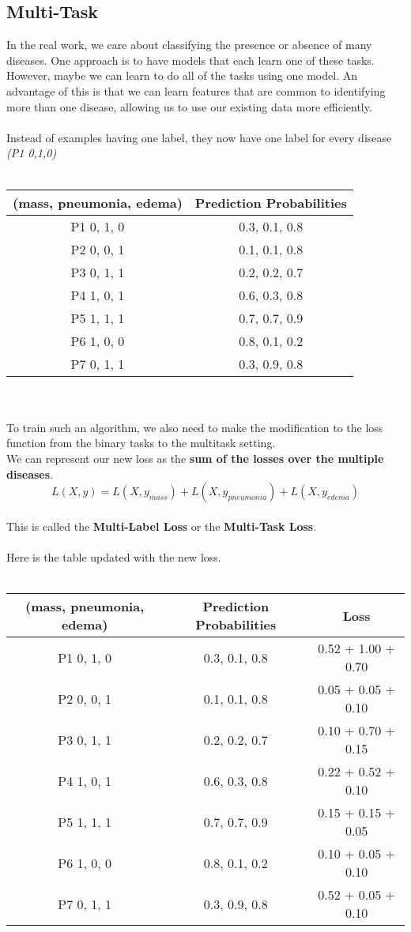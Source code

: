 \documentclass[a4paper,12pt]{article}
\begin{document}
\subsection{Multi-Task}
In the real work, we care about classifying the presence or absence of many diseases. One approach is to have models that each learn one of these tasks.\\
However, maybe we can learn to do all of the tasks using one model. An advantage of this is that we can learn features that are common to identifying more than one disease, allowing us to use our existing data more efficiently.\\
\\
Instead of examples having one label, they now have one label for every disease \textit{(P1 0,1,0)}\\
\\
\begin{tabular}{|c c|}
	\hline
	(mass, pneumonia, edema) & Prediction Probabilities \\
	\hline
	P1 0, 1, 0 & 0.3, 0.1, 0.8 \\
	P2 0, 0, 1 & 0.1, 0.1, 0.8 \\
	P3 0, 1, 1 & 0.2, 0.2, 0.7 \\
	P4 1, 0, 1 & 0.6, 0.3, 0.8 \\
	P5 1, 1, 1 & 0.7, 0.7, 0.9 \\
	P6 1, 0, 0 & 0.8, 0.1, 0.2 \\
	P7 0, 1, 1 & 0.3, 0.9, 0.8 \\
	\hline
\end{tabular}\\
\\
To train such an algorithm, we also need to make the modification to the loss function from the binary tasks to the multitask setting.\\
We can represent our new loss as the \textbf{sum of the losses over the multiple diseases}.\\
\[ L(X,y)=L(X,y_{mass}) + L(X,y_{pneumonia}) + L(X,y_{edema}) \]\\
This is called the \textbf{Multi-Label Loss} or the \textbf{Multi-Task Loss}.\\
\\
Here is the table updated with the new loss.\\
\\
\begin{tabular}{|c c c|}
	\hline
	(mass, pneumonia, edema) & Prediction Probabilities & Loss\\
	\hline
	P1 0, 1, 0 & 0.3, 0.1, 0.8 & 0.52 + 1.00 + 0.70\\
	P2 0, 0, 1 & 0.1, 0.1, 0.8 & 0.05 + 0.05 + 0.10\\
	P3 0, 1, 1 & 0.2, 0.2, 0.7 & 0.10 + 0.70 + 0.15\\
	P4 1, 0, 1 & 0.6, 0.3, 0.8 & 0.22 + 0.52 + 0.10\\
	P5 1, 1, 1 & 0.7, 0.7, 0.9 & 0.15 + 0.15 + 0.05\\
	P6 1, 0, 0 & 0.8, 0.1, 0.2 & 0.10 + 0.05 + 0.10\\
	P7 0, 1, 1 & 0.3, 0.9, 0.8 & 0.52 + 0.05 + 0.10\\
	\hline
\end{tabular}\\
\end{document}
